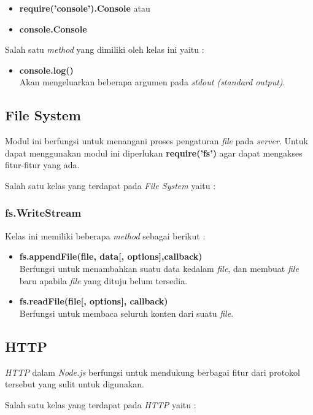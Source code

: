 \begin{itemize}
	\item \textbf{require('console').Console} atau
	\item \textbf{console.Console}
\end{itemize}

Salah satu \textit{method} yang dimiliki oleh kelas ini yaitu : 

\begin{itemize}
	\item \textbf{console.log()} \\ Akan mengeluarkan beberapa argumen pada \textit{stdout (standard output)}.
\end{itemize}

\subsection{File System}
Modul ini berfungsi untuk menangani proses pengaturan \textit{file} pada \textit{server}. Untuk dapat menggunakan modul ini diperlukan \textbf{require('fs')} agar dapat mengakses fitur-fitur yang ada.

Salah satu kelas yang terdapat pada \textit{File System} yaitu : 

\subsubsection{fs.WriteStream}
Kelas ini memiliki beberapa \textit{method} sebagai berikut : 

\begin{itemize}
	\item \textbf{fs.appendFile(file, data[, options],callback)} \\ Berfungsi untuk menambahkan suatu data kedalam \textit{file}, dan membuat \textit{file} baru apabila \textit{file} yang dituju belum tersedia.
	\item \textbf{fs.readFile(file[, options], callback)} \\ Berfungsi untuk membaca seluruh konten dari suatu \textit{file}.
\end{itemize}

\subsection{HTTP}
\textit{HTTP} dalam \textit{Node.js} berfungsi untuk mendukung berbagai fitur dari protokol tersebut yang sulit untuk digunakan. 

Salah satu kelas yang terdapat pada \textit{HTTP} yaitu : 

